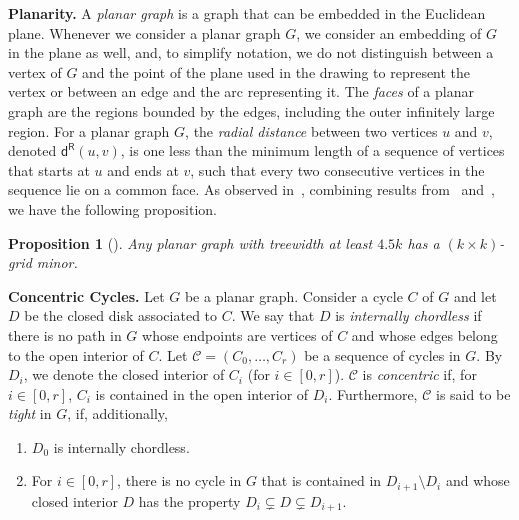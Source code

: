 \documentclass{article}
\newtheorem{proposition}[theorem]{Proposition}
\numberwithin{claimcounter}{lemma}
\begin{document}
\medskip
\noindent\textbf{Planarity.} 
A \textit{planar graph} is a graph that can be embedded in the Euclidean plane. Whenever we consider a planar graph $G$, we consider an embedding of $G$ in the plane as well, and, to simplify notation, we do not distinguish between a vertex of $G$ and the point of the plane used in the drawing to represent the vertex or between an edge and the arc representing it. The \textit{faces}  of a planar graph are the regions bounded by the edges, including the outer infinitely large region. For a planar graph $G$, the \emph{radial distance} between two vertices $u$ and $v$, denoted $\mathsf{d^R}(u,v)$, is one less than the minimum length of a sequence of vertices that starts at $u$ and ends at $v$, such that every two consecutive vertices in the sequence lie on a common face.
As observed in~\cite{JCTB}, combining results from~\cite{gu2012improved} and~\cite{robertson1991graph}, we have the following proposition.

\begin{proposition}[\cite{JCTB}]\label{P:tw}
 Any planar graph with treewidth at least $4.5k$ has a $(k \times k)$-grid minor.   
\end{proposition}





\medskip
\noindent
\textbf{Concentric Cycles.}
Let $G$ be a planar graph. Consider a cycle $C$ of $G$ and let $D$ be the closed disk associated to $C$.  We say that $D$ is \textit{internally chordless} if there is no path in $G$ whose endpoints are vertices  of $C$ and whose edges belong to the open interior of $C$. Let $\mathcal{C} = (C_0,\ldots,C_r)$ be a sequence of cycles in $G$. By $D_i$, we denote the closed interior of $C_i$ (for $i\in [0,r]$). $\mathcal{C}$ is \textit{concentric} if, for $i\in [0,r]$, $C_i$ is contained in the open interior of $D_{i}$. Furthermore, $\mathcal{C}$ is said to be \textit{tight} in $G$, if, additionally,
\begin{enumerate}
    \item $D_0$ is internally chordless.
    \item For $i\in [0,r]$, there is no cycle in $G$ that is contained in $D_{i+1}\setminus D_i$ and whose closed interior $D$  has the property $D_i \subsetneq D \subsetneq D_{i+1}$. 
\end{enumerate}
\end{document}
